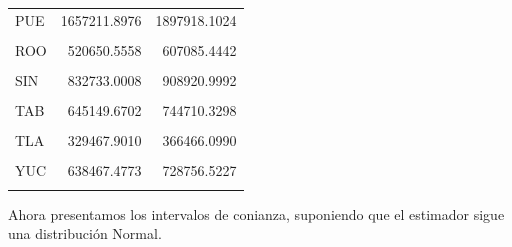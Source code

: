 \documentclass[
]{article}
\newenvironment{Shaded}{\begin{snugshade}}{\end{snugshade}}
\newcommand{\DataTypeTok}[1]{\textcolor[rgb]{0.13,0.29,0.53}{#1}}
\newcommand{\KeywordTok}[1]{\textcolor[rgb]{0.13,0.29,0.53}{\textbf{#1}}}
\newcommand{\NormalTok}[1]{#1}
\newcommand{\OperatorTok}[1]{\textcolor[rgb]{0.81,0.36,0.00}{\textbf{#1}}}
\newcommand{\StringTok}[1]{\textcolor[rgb]{0.31,0.60,0.02}{#1}}
\begin{document}
\begin{table}[H]
\begin{tabular}[t]{lrr}
PUE & 1657211.8976 & 1897918.1024\\
\cellcolor{gray!6}{QUE} & \cellcolor{gray!6}{615044.0598} & \cellcolor{gray!6}{745465.9402}\\
ROO & 520650.5558 & 607085.4442\\
\cellcolor{gray!6}{SLP} & \cellcolor{gray!6}{759130.4766} & \cellcolor{gray!6}{822631.5234}\\
\addlinespace
SIN & 832733.0008 & 908920.9992\\
\cellcolor{gray!6}{SON} & \cellcolor{gray!6}{831828.0407} & \cellcolor{gray!6}{934381.9593}\\
TAB & 645149.6702 & 744710.3298\\
\cellcolor{gray!6}{TAM} & \cellcolor{gray!6}{1014232.3018} & \cellcolor{gray!6}{1101967.6982}\\
TLA & 329467.9010 & 366466.0990\\
\addlinespace
\cellcolor{gray!6}{VER} & \cellcolor{gray!6}{2255161.7162} & \cellcolor{gray!6}{2549446.2838}\\
YUC & 638467.4773 & 728756.5227\\
\cellcolor{gray!6}{ZAC} & \cellcolor{gray!6}{430772.9547} & \cellcolor{gray!6}{494859.0453}\\
\bottomrule
\end{tabular}
\end{table}

Ahora presentamos los intervalos de conianza, suponiendo que el
estimador sigue una distribución Normal.

\begin{Shaded}
\end{Shaded}
\end{document}

